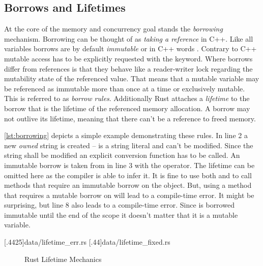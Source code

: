 \documentclass[thesis]{subfiles}
\begin{document}
  \subsection{Borrows and Lifetimes}\label{sec:rustBorr}
    At the core of the memory and concurrency goal stands the \emph{borrowing} mechanism.
    Borrowing can be thought of as \emph{taking a reference} in C++.
    Like all variables borrows are by default \emph{immutable} or in C++ words .
    Contrary to C++ mutable access has to be explicitly requested with the  keyword.
    Where borrows differ from references is that they behave like a reader-writer lock regarding the mutability state of the referenced value.
    That means that a mutable variable may be referenced as immutable more than once at a time or exclusively mutable.
    This is referred to as \emph{borrow rules}.
    Additionally Rust attaches a \emph{lifetime} to the borrow that is the lifetime of the referenced memory allocation.
    A borrow may not outlive its lifetime, meaning that there can't be a reference to freed memory.


    \autoref{lst:borrowing} depicts a simple example demonstrating these rules.
    In line 2 a new \emph{owned} string is created --  is a string literal and can't be modified.
    Since the string shall be modified an explicit conversion function has to be called.
    An immutable borrow is taken from  in line 3 with the \codr{&} operator.
    The lifetime can be omitted here as the compiler is able to infer it.
    It is fine to use both  and  to call methods that require an immutable borrow on the object.
    But, using a method that requires a mutable borrow on  will lead to a compile-time error.
    It might be surprising, but line 8 also leads to a compile-time error.
    Since  is borrowed immutable until the end of the scope it doesn't matter that it is a mutable variable.

    \LstTikzBox{\lifetimeErrBox}[.4425\linewidth]{data/lifetime_err.rs}
    \LstTikzBox{\lifetimeFixBox}[.44\linewidth]{data/lifetime_fixed.rs}
    \begin{figure}[ht]
      \captionsetup{type=lstlisting}
      \hfill%
      \caption{Rust Lifetime Mechanics}\label{lst:lifetime}
    \end{figure}
\end{document}
